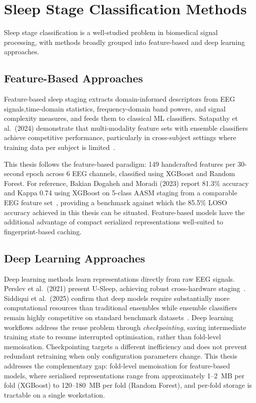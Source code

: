 \section{Sleep Stage Classification Methods}
\label{sec:sleep_classification}

Sleep stage classification is a well-studied problem in biomedical signal
processing, with methods broadly grouped into feature-based and deep learning
approaches.

\subsection{Feature-Based Approaches}

Feature-based sleep staging extracts domain-informed descriptors from EEG
signals,time-domain statistics, frequency-domain band powers, and signal
complexity measures, and feeds them to classical ML
classifiers. Satapathy et al.\ (2024) demonstrate that multi-modality feature
sets with ensemble classifiers achieve competitive performance, particularly
in cross-subject settings where training data per subject is
limited~\cite{satapathy2024multimodal}.

This thesis follows the feature-based paradigm: 149 handcrafted features per
30-second epoch across 6 EEG channels, classified using XGBoost and Random
Forest. For reference, Bakian Dogaheh and Moradi (2023) report 81.3\%
accuracy and Kappa 0.74 using XGBoost on 5-class AASM staging from a
comparable EEG feature set~\cite{bakian2023xgboost}, providing a benchmark
against which the 85.5\% LOSO accuracy achieved in this thesis can be
situated. Feature-based models have the additional advantage of compact
serialized representations well-suited to fingerprint-based caching.

\subsection{Deep Learning Approaches}

Deep learning methods learn representations directly from raw EEG signals.
Perslev et al.\ (2021) present U-Sleep, achieving robust cross-hardware
staging~\cite{perslev2021usleep}. Siddiqui et al.\ (2025) confirm that deep
models require substantially more computational resources than traditional
ensembles while ensemble classifiers remain highly competitive on
standard benchmark datasets~\cite{siddiqui2025}. Deep learning workflows
address the reuse problem through \textit{checkpointing}, saving intermediate
training state to resume interrupted optimisation, rather than fold-level
memoisation. Checkpointing targets a different inefficiency and does not
prevent redundant retraining when only configuration parameters change.
This thesis addresses the complementary gap: fold-level memoisation for
feature-based models, where serialised representations range from
approximately 1--2~MB per fold (XGBoost) to 120--180~MB per fold
(Random Forest), and per-fold storage is tractable on a single workstation.

